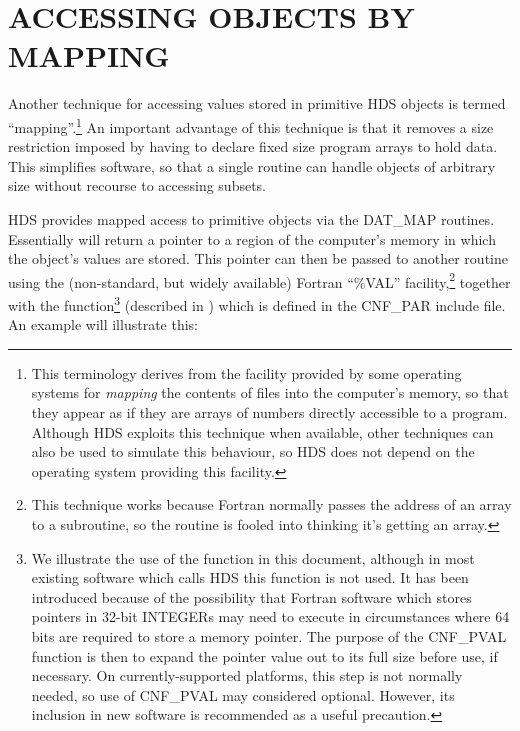 \documentclass[twoside,11pt]{starlink}
\providecommand{\qt}[1]{``#1''}
\providecommand{\st}[1]{{\emph{#1}}}
\begin{document}
\section{\label{sect:mapping}ACCESSING OBJECTS BY MAPPING}

Another technique for accessing values stored in primitive HDS objects
is termed \qt{mapping}.\footnote{This terminology derives from the
facility provided by some operating systems for \st{mapping} the
contents of files into the computer's memory, so that they appear as
if they are arrays of numbers directly accessible to a
program. Although HDS exploits this technique when available, other
techniques can also be used to simulate this behaviour, so HDS does
not depend on the operating system providing this facility.} An
important advantage of this technique is that it removes a size
restriction imposed by having to declare fixed size program arrays to
hold data. This simplifies software, so that a single routine can
handle objects of arbitrary size without recourse to accessing
subsets.

HDS provides mapped access to primitive objects via the DAT\_MAP
routines. Essentially  will return a
pointer to a region of the computer's memory in which the object's
values are stored. This pointer can then be passed to another routine
using the (non-standard, but widely available) Fortran \qt{\%VAL}
facility,\footnote{This technique works because Fortran normally
passes the address of an array to a subroutine, so the routine is
fooled into thinking it's getting an array.} together with the
 function\footnote{We illustrate the
use of the  function in this
document, although in most existing software which calls HDS this
function is not used. It has been introduced because of the
possibility that Fortran software which stores pointers in 32-bit
INTEGERs may need to execute in circumstances where 64 bits are
required to store a memory pointer. The purpose of the CNF\_PVAL
function is then to expand the pointer value out to its full size
before use, if necessary. On currently-supported platforms, this step
is not normally needed, so use of CNF\_PVAL may considered
optional. However, its inclusion in new software is recommended as a
useful precaution.} (described in ) which is
defined in the CNF\_PAR include file.  An example will illustrate
this:
\end{document}
